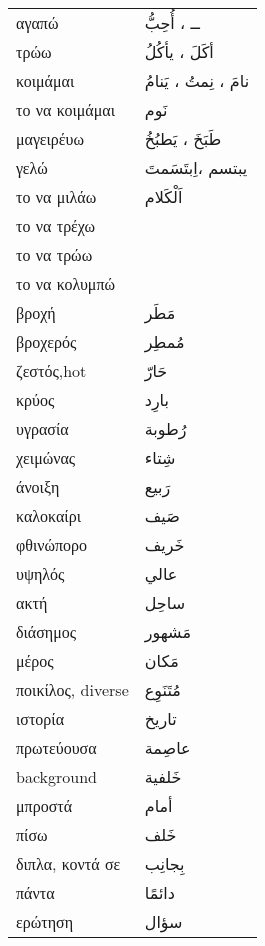 \documentclass[twocolumn,a4paper]{article}
\newcommand{\ar}[1]{\textarabic{#1}}
\newcommand{\vrf}{\raisebox{0.15ex}{\footnotesize ◉}}
\newcommand{\vr}{\raisebox{0.15ex}{\footnotesize ◎}}
\newcommand{\mas}{\raisebox{0.15ex}{\footnotesize ◫}}
\begin{document}
\begin{mpsupertabular}{ P{0.5\textwidth} P{0.5\textwidth} }
αγαπώ \vr            & \ar{ ــ ، أُحِبُّ } \\  %
τρώω  \vrf           & \ar{ أكَلَ ، يأكُلُ }  \\
κοιμάμαι \vrf   & \ar{ نامَ ، نِمتُ ، يَنامُ }  \\
το να κοιμάμαι \mas      & \ar{ نَوم } \\
μαγειρέυω \vrf       & \ar{ طَبَخَ ، يَطبُخُ } \\
γελώ \vrf            & \ar{ يبتسم ،اِبتَسَمتَ }  \\
το να μιλάω \mas      & \ar{ اَلْكَلام } \\
το να τρέχω \mas      & \ar{  } \\
το να τρώω \mas      & \ar{  } \\
το να κολυμπώ \mas      & \ar{  } \\
βροχή                & \ar{ مَطَر } \\
βροχερός             & \ar{ مُمطِر } \\
ζεστός,hot           & \ar{ حَارّ } \\
κρύος                & \ar{ بارِد } \\
υγρασία              & \ar{ رُطوبة } \\
χειμώνας             & \ar{ شِتاء } \\
άνοιξη               & \ar{ رَبيع } \\
καλοκαίρι            & \ar{ صَيف } \\
φθινώπορο            & \ar{ خَريف } \\
υψηλός               & \ar{ عالي } \\
ακτή                 & \ar{ ساحِل } \\
διάσημος             & \ar{ مَشهور } \\
μέρος                & \ar{ مَكان } \\
ποικίλος, diverse    & \ar{ مُتَنَوِع } \\
ιστορία              & \ar{ تاريخ } \\
πρωτεύουσα           & \ar{ عاصِمة } \\
background           & \ar{ خَلفية } \\
μπροστά              & \ar{ أمام } \\
πίσω                 & \ar{ خَلف } \\
διπλα, κοντά σε      & \ar{ بِجانِب } \\
πάντα                & \ar{ دائمًا } \\
ερώτηση              & \ar{ سؤال } \\

\end{mpsupertabular}
\end{document}
